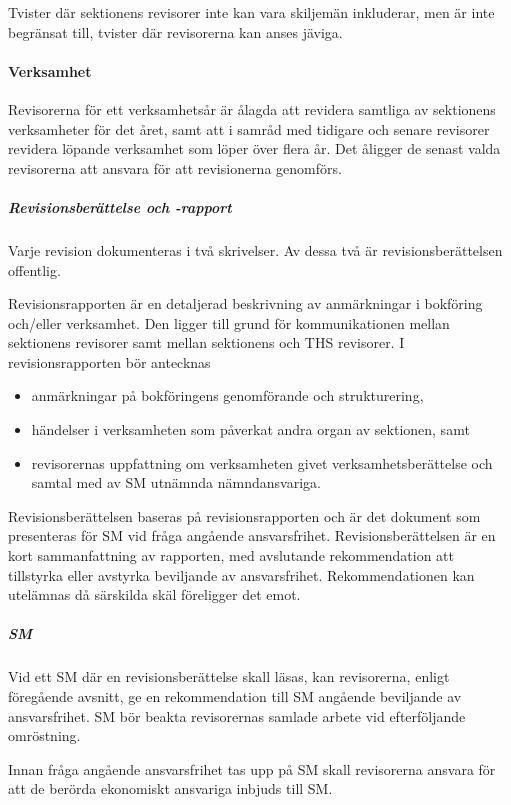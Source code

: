 \documentclass{dgovdoc}
\begin{document}
Tvister där sektionens revisorer inte kan vara skiljemän inkluderar, men är inte begränsat till, tvister där revisorerna kan anses jäviga.

\paragraph{Verksamhet}

Revisorerna för ett verksamhetsår är ålagda att revidera samtliga av sektionens verksamheter för det året, samt att i samråd med tidigare och senare revisorer revidera löpande verksamhet som löper över flera år. Det åligger de senast valda revisorerna att ansvara för att revisionerna genomförs.

\subparagraph{Revisionsberättelse och -rapport}

Varje revision dokumenteras i två skrivelser. Av dessa två är revisionsberättelsen offentlig.

Revisionsrapporten är en detaljerad beskrivning av anmärkningar i bokföring och/eller verksamhet. Den ligger till grund för kommunikationen mellan sektionens revisorer samt mellan sektionens och THS revisorer. I revisionsrapporten bör antecknas

\begin{itemize}
  \item anmärkningar på bokföringens genomförande och strukturering,
  \item händelser i verksamheten som påverkat andra organ av sektionen, samt
  \item revisorernas uppfattning om verksamheten givet verksamhetsberättelse och samtal med av SM utnämnda nämndansvariga.
\end{itemize}

Revisionsberättelsen baseras på revisionsrapporten och är det dokument som presenteras för SM vid fråga angående ansvarsfrihet. Revisionsberättelsen är en kort sammanfattning av rapporten, med avslutande rekommendation att tillstyrka eller avstyrka beviljande av ansvarsfrihet. Rekommendationen kan utelämnas då särskilda skäl föreligger det emot.

\subparagraph{SM}

Vid ett SM där en revisionsberättelse skall läsas, kan revisorerna, enligt föregående avsnitt, ge en rekommendation till SM angående beviljande av ansvarsfrihet. SM bör beakta revisorernas samlade arbete vid efterföljande omröstning.

Innan fråga angående ansvarsfrihet tas upp på SM skall revisorerna ansvara för att de berörda ekonomiskt ansvariga inbjuds till SM.
\end{document}
